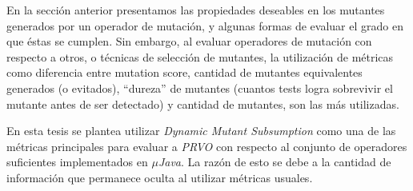 En la secci\'on anterior presentamos las propiedades deseables en los mutantes generados por un operador de mutaci\'on, y algunas formas de evaluar el grado en que \'estas se cumplen. Sin embargo, al evaluar operadores de mutaci\'on con respecto a otros, o t\'ecnicas de selecci\'on de mutantes, la utilizaci\'on de m\'etricas como diferencia entre mutation score, cantidad de mutantes equivalentes generados (o evitados), ``dureza'' de mutantes (cuantos tests logra sobrevivir el mutante antes de ser detectado) y cantidad de mutantes, son las m\'as utilizadas.

En esta tesis se plantea utilizar \emph{Dynamic Mutant Subsumption} como una de las m\'etricas principales para evaluar a \emph{PRVO} con respecto al conjunto de operadores suficientes implementados en \emph{$\mu$Java}. La raz\'on de esto se debe a la cantidad de informaci\'on que permanece oculta al utilizar m\'etricas usuales.

